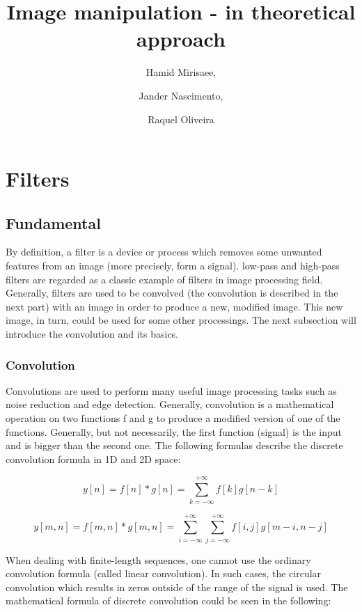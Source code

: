 \documentclass{article}
\begin{document}
\title{Image manipulation - in theoretical approach}

\author{Hamid Mirisaee,
\and Jander Nascimento, 
\and Raquel Oliveira}

\maketitle

\tableofcontents

\section{Filters}

	\subsection{Fundamental}

		By definition, a filter is a device or process which removes some unwanted features from an image (more precisely, form a signal).
		low-pass and high-pass filters are regarded as a classic example of filters in image processing field. Generally, filters are used to be convolved 
		(the convolution is described in the next part) with an image in order to produce a new, modified image. This new image, in turn, could
		be used for some other processings. The next subsection will introduce the convolution and its basics.
		
		\subsubsection{Convolution}

			Convolutions are used to perform many useful image processing tasks such as noise reduction and edge detection. Generally,
			convolution is a mathematical operation on two functions f and g to produce a modified version of one of the functions.
			Generally, but not necessarily, the first function (signal) is the input and is bigger than the second one.
			The following formulas describe the discrete convolution formula in 1D and 2D space:


			\[y[n] = f[n]*g[n] = \sum_{k=-\infty}^{+\infty} f[k]g[n-k]\]

			\[y[m,n] = f[m,n]*g[m,n] = \sum_{i=-\infty}^{+\infty}\sum_{j=-\infty}^{+\infty}f[i,j]g[m-i,n-j]\]


			
			When dealing with finite-length sequences, one cannot use the ordinary convolution formula (called linear convolution).
			In such cases, the circular convolution which results in zeros outside of the range of the signal is used. The mathematical formula of discrete 
			convolution could be seen in the following:
\end{document}
